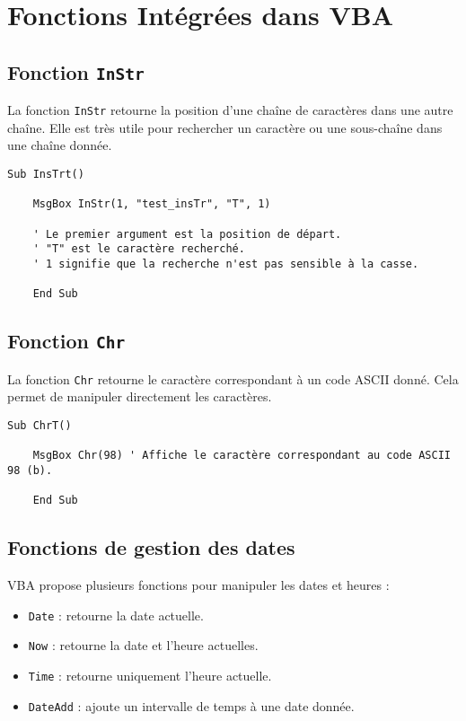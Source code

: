 \documentclass[a4paper,12pt]{report}
\begin{document}
\section{Fonctions Intégrées dans VBA}

\subsection{Fonction \texttt{InStr}}
La fonction \texttt{InStr} retourne la position d'une chaîne de caractères dans une autre chaîne. Elle est très utile pour rechercher un caractère ou une sous-chaîne dans une chaîne donnée.

\begin{lstlisting}[caption=Exemple de fonction InStr]
	Sub InsTrt()
	
	MsgBox InStr(1, "test_insTr", "T", 1)
	
	' Le premier argument est la position de départ.
	' "T" est le caractère recherché.
	' 1 signifie que la recherche n'est pas sensible à la casse.
	
	End Sub
\end{lstlisting}

\subsection{Fonction \texttt{Chr}}
La fonction \texttt{Chr} retourne le caractère correspondant à un code ASCII donné. Cela permet de manipuler directement les caractères.

\begin{lstlisting}[caption=Exemple de fonction Chr]
	Sub ChrT()
	
	MsgBox Chr(98) ' Affiche le caractère correspondant au code ASCII 98 (b).
	
	End Sub
\end{lstlisting}

\subsection{Fonctions de gestion des dates}

VBA propose plusieurs fonctions pour manipuler les dates et heures :

\begin{itemize}
	\item \texttt{Date} : retourne la date actuelle.
	\item \texttt{Now} : retourne la date et l'heure actuelles.
	\item \texttt{Time} : retourne uniquement l'heure actuelle.
	\item \texttt{DateAdd} : ajoute un intervalle de temps à une date donnée.
\end{itemize}
\end{document}

